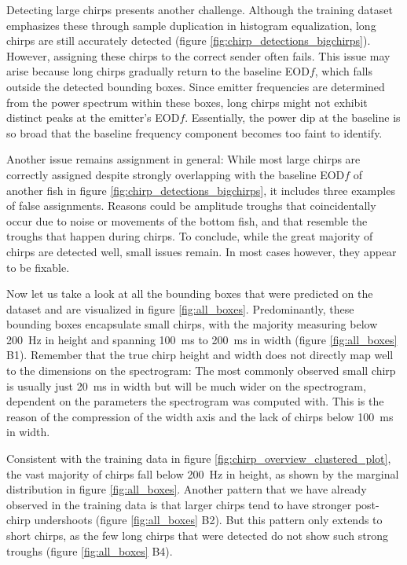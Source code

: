 Detecting large chirps presents another challenge. Although the training
dataset emphasizes these through sample duplication in histogram equalization,
long chirps are still accurately detected (figure
\ref{fig:chirp_detections_bigchirps}). However, assigning these chirps to the
correct sender often fails. This issue may arise because long chirps gradually
return to the baseline EOD$f$, which falls outside the detected bounding boxes.
Since emitter frequencies are determined from the power spectrum within these
boxes, long chirps might not exhibit distinct peaks at the emitter's EOD$f$.
Essentially, the power dip at the baseline is so broad that the baseline
frequency component becomes too faint to identify.

Another issue remains assignment in general: While most large chirps are
correctly assigned despite strongly overlapping with the baseline EOD$f$ of
another fish in figure \ref{fig:chirp_detections_bigchirps}, it includes three
examples of false assignments. Reasons could be amplitude troughs that
coincidentally occur due to noise or movements of the bottom fish, and that
resemble the troughs that happen during chirps. To conclude, while the great
majority of chirps are detected well, small issues remain. In most cases
however, they appear to be fixable.

Now let us take a look at all the bounding boxes that were predicted on the
dataset and are visualized in figure \ref{fig:all_boxes}. Predominantly, these
bounding boxes encapsulate small chirps, with the majority measuring below
\SI{200}{\hertz} in height and spanning \SI{100}{\milli\second} to
\SI{200}{\milli\second} in width (figure \ref{fig:all_boxes} B1). Remember that
the true chirp height and width does not directly map well to the dimensions on
the spectrogram: The most commonly observed small chirp is usually just
\SI{20}{\milli\second} in width but will be much wider on the spectrogram,
dependent on the parameters the spectrogram was computed with. This is the
reason of the compression of the width axis and the lack of chirps below
\SI{100}{\milli\second} in width.

Consistent with the training data in figure
\ref{fig:chirp_overview_clustered_plot}, the vast majority of chirps fall below
\SI{200}{\hertz} in height, as shown by the marginal distribution in figure
\ref{fig:all_boxes}. Another pattern that we have already observed in the
training data is that larger chirps tend to have stronger post-chirp
undershoots (figure \ref{fig:all_boxes} B2). But this pattern only extends to
short chirps, as the few long chirps that were detected do not show such strong
troughs (figure \ref{fig:all_boxes} B4).

